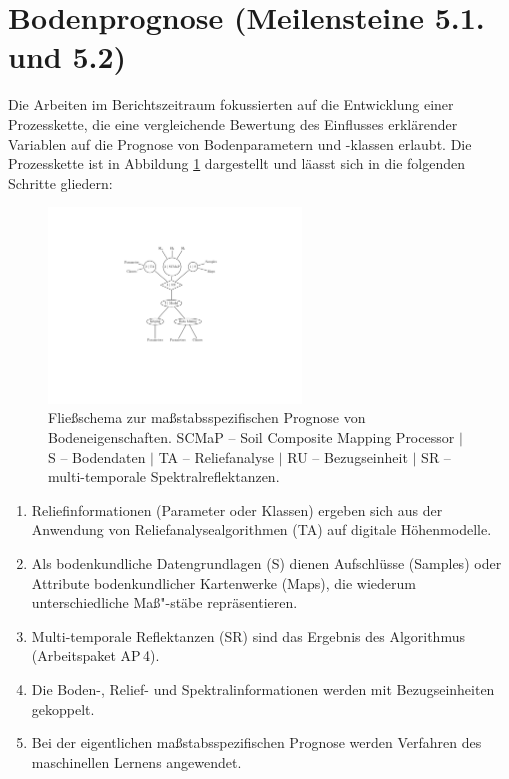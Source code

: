 \maketitle


\tableofcontents
\newpage

\section{Bodenprognose (Meilensteine 5.1. und 5.2)}
Die Arbeiten im Berichtszeitraum fokussierten auf die  Entwicklung einer Prozesskette, die eine vergleichende Bewertung des Einflusses erklärender Variablen auf die Prognose von Bodenparametern und -klassen erlaubt. Die Prozesskette ist in Abbildung \ref{fig:scheme} dargestellt und läasst sich in die folgenden Schritte gliedern:

\begin{figure}[t]
    \centering
    \centering\includegraphics[width=0.6\textwidth]{figures/SOIL_DE_scheme.pdf}
    \caption{Fließschema zur maßstabsspezifischen Prognose von Bodeneigenschaften. SCMaP --  Soil Composite Mapping Processor $|$ S -- Bodendaten $|$ TA -- Reliefanalyse $|$ RU -- Bezugseinheit $|$ SR -- multi-temporale Spektralreflektanzen.}
    \label{fig:scheme}
\end{figure}

\begin{enumerate}
     \item Reliefinformationen (Parameter oder Klassen) ergeben sich aus der Anwendung von Reliefanalysealgorithmen (TA) auf digitale Höhenmodelle.
      \item Als bodenkundliche Datengrundlagen (S) dienen Aufschlüsse (Samples) oder Attribute bodenkundlicher Kartenwerke (Maps), die wiederum unterschiedliche Maß"-stäbe repräsentieren.
     \item Multi-temporale Reflektanzen (SR) sind das Ergebnis des Algorithmus  (Arbeitspaket AP\,4).
     \item Die Boden-, Relief- und Spektralinformationen werden mit Bezugseinheiten gekoppelt. 
     \item Bei der eigentlichen maßstabsspezifischen Prognose werden Verfahren des maschinellen Lernens angewendet.
 \end{enumerate}

